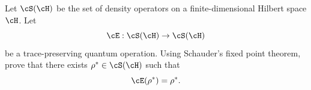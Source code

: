Let $\cS(\cH)$ be the set of density operators on a finite-dimensional Hilbert space $\cH$. Let
$$
\cE:\cS(\cH)\to\cS(\cH)
$$
be a trace-preserving quantum operation. Using Schauder's fixed point theorem, prove that there exists $\rho^*\in\cS(\cH)$ such that
$$
\cE(\rho^*)=\rho^*.
$$

